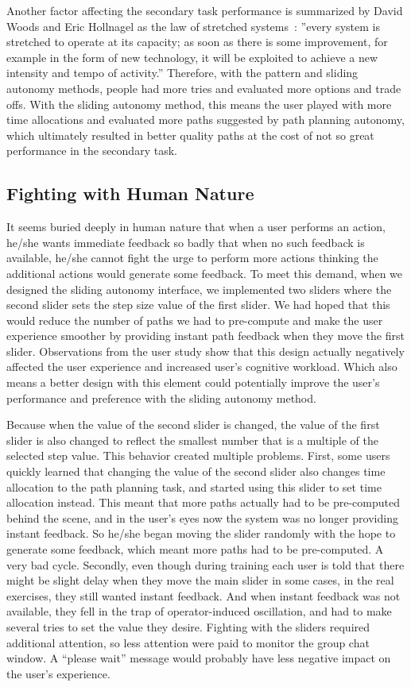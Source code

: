 \documentclass[journal]{IEEEtran}
\begin{document}
Another factor affecting the secondary task performance is summarized by David Woods and Eric Hollnagel as the law of stretched systems~\cite{Woods2006Joint}: ''every system is stretched to operate at its capacity; as soon as there is some improvement, for example in the form of new technology, it will be exploited to achieve a new intensity and tempo of activity.'' Therefore, with the pattern and sliding autonomy methods, people had more tries and evaluated more options and trade offs. With the sliding autonomy method, this means the user played with more time allocations and evaluated more paths suggested by path planning autonomy, which ultimately resulted in better quality paths at the cost of not so great performance in the secondary task.

\subsection{Fighting with Human Nature}

It seems buried deeply in human nature that when a user performs an action, he/she wants immediate feedback so badly that when no such feedback is available, he/she cannot fight the urge to perform more actions thinking the additional actions would generate some feedback. To meet this demand, when we designed the sliding autonomy interface, we implemented two sliders where the second slider sets the step size value of the first slider. We had hoped that this would reduce the number of paths we had to pre-compute and make the user experience smoother by providing instant path feedback when they move the first slider. Observations from the user study show that this design actually negatively affected the user experience and increased user's cognitive workload. Which also means a better design with this element could potentially improve the user's performance and preference with the sliding autonomy method.

Because when the value of the second slider is changed, the value of the first slider is also changed to reflect the smallest number that is a multiple of the selected step value. This behavior created multiple problems. First, some users quickly learned that changing the value of the second slider also changes time allocation to the path planning task, and started using this slider to set time allocation instead. This meant that more paths actually had to be pre-computed behind the scene, and in the user's eyes now the system was no longer providing instant feedback. So he/she began moving the slider randomly with the hope to generate some feedback, which meant more paths had to be pre-computed. A very bad cycle. Secondly, even though during training each user is told that there might be slight delay when they move the main slider in some cases, in the real exercises, they still wanted instant feedback. And when instant feedback was not available, they fell in the trap of operator-induced oscillation, and had to make several tries to set the value they desire. Fighting with the sliders required additional attention, so less attention were paid to monitor the group chat window. A ``please wait'' message would probably have less negative impact on the user's experience.
\end{document}
